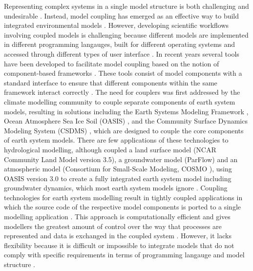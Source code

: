 \documentclass{icldt}\usepackage[]{graphicx}\usepackage[]{color}
\begin{document}
Representing complex systems in a single model structure is both challenging and undesirable \citep{beven2007}. Instead, model coupling has emerged as an effective way to build integrated environmental models \citep{goodall2011,bulatewicz2012,yue2014}. However, developing scientific workflows involving coupled models is challenging because different models are implemented in different programming langauges, built for different operating systems and accessed through different types of user interface \citep{buytaert2008,castronova2013,weiler2015,yue2015}. In recent years several tools have been developed to facilitate model coupling based on the notion of component-based frameworks \citet{argent2004}. These tools consist of model components with a standard interface to ensure that different components within the same framework interact correctly \citep{valcke2012}. The need for couplers was first addressed by the climate modelling community to couple separate components of earth system models, resulting in solutions including the Earth Systems Modeling Framework \citep{hill2004}, Ocean Atmosphere Sea Ice Soil (OASIS) \citep{}, and the Community Surface Dynamics Modeling System (CSDMS) \citep{}, which are designed to couple the core components of earth system models. There are few applications of these technologies to hydrological modelling, although \citet{shrestha2014} coupled a land surface model (NCAR Community Land Model version 3.5), a groundwater model (ParFlow) and an atmospheric model (Consortium for Small-Scale Modeling, COSMO \citep{}), using OASIS version 3.0 to create a fully integrated earth system model including groundwater dynamics, which most earth system models ignore \citep{maxwell2005}. Coupling technologies for earth system modelling result in tightly coupled applications in which the source code of the respective model components is ported to a single modelling application \citep{goodall2011}. This approach is computationally efficient and gives modellers the greatest amount of control over the way that processes are represented and data is exchanged in the coupled system \citep{goodall2011,buahin2015}. However, it lacks flexibility because it is difficult or impossible to integrate models that do not comply with specific requirements in terms of programming langauge and model structure \citep{goodall2011,salas2012}. \\
\end{document}

